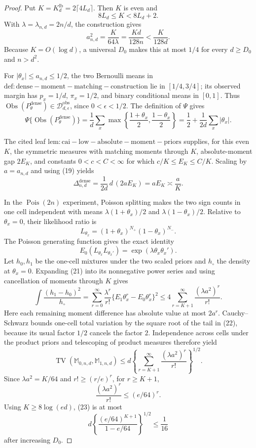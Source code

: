 \documentclass{article}
\begin{document}
\begin{proof}
Put \(K=K_d^{\mathrm{lb}}=2\lceil4L_d\rceil\).  Then \(K\) is even and
\[
 8L_d\leq K<8L_d+2.                                                  \tag{18}
\]
With \(\lambda=\lambda_{n,d}=2n/d\), the construction gives
\[
 a_{n,d}^2=\frac K{64\lambda}=\frac{Kd}{128n}<\frac K{128d}.
\]
Because \(K=O(\log d)\), a universal \(D_0\) makes this at most \(1/4\) for every \(d\geq D_0\) and \(n>d^2\).

For \(|\theta_x|\leq a_{n,d}\leq1/2\), the two Bernoulli means in \(\mathrm{def:dense-moment-matching-construction}\) lie in \([1/4,3/4]\); its observed margin has \(p_x=1/d\), \(\pi_x=1/2\), and binary conditional means in \([0,1]\).  Thus \(\operatorname{Obs}(P_\theta^{\mathrm{dense}})\in\mathcal D_{d,\epsilon}^{\mathrm{obs}}\), since \(0<\epsilon<1/2\).  The definition of \(\Psi\) gives
\[
 \Psi\{\operatorname{Obs}(P_\theta^{\mathrm{dense}})\}
 =\frac1d\sum_x\max\left\{\frac{1+\theta_x}{2},\frac{1-\theta_x}{2}\right\}
 =\frac12+\frac1{2d}\sum_x|\theta_x|.                              \tag{19}
\]

The cited leaf \(\mathrm{lem:cai-low-absolute-moment-priors}\) supplies, for this even \(K\), the symmetric measures with matching moments through \(K\), absolute-moment gap \(2E_K\), and constants \(0<c<C<\infty\) for which \(c/K\leq E_K\leq C/K\).  Scaling by \(a=a_{n,d}\) and using (19) yields
\[
 \Delta_{n,d}^{\mathrm{dense}}=\frac1{2d}\,d\,(2aE_K)=aE_K
 \asymp\frac aK.                                                     \tag{20}
\]

In the \(\operatorname{Pois}(2n)\) experiment, Poisson splitting makes the two sign counts in one cell independent with means \(\lambda(1+\theta_x)/2\) and \(\lambda(1-\theta_x)/2\).  Relative to \(\theta_x=0\), their likelihood ratio is
\[
 L_{\theta_x}=(1+\theta_x)^{N_+}(1-\theta_x)^{N_-}.
\]
The Poisson generating function gives the exact identity
\[
 E_0(L_{\theta_x}L_{\theta_x'})
 =\exp(\lambda\theta_x\theta_x').                                  \tag{21}
\]
Let \(h_0,h_1\) be the one-cell mixtures under the two scaled priors and \(h_\circ\) the density at \(\theta_x=0\).  Expanding (21) into its nonnegative power series and using cancellation of moments through \(K\) gives
\[
 \int\frac{(h_1-h_0)^2}{h_\circ}
 =\sum_{r=0}^{\infty}\frac{\lambda^r}{r!}
   \{E_1\theta_x^r-E_0\theta_x^r\}^2
 \leq4\sum_{r=K+1}^{\infty}\frac{(\lambda a^2)^r}{r!}.           \tag{22}
\]
Here each remaining moment difference has absolute value at most \(2a^r\).  Cauchy--Schwarz bounds one-cell total variation by the square root of the tail in (22), because its usual factor \(1/2\) cancels the factor \(2\).  Independence across cells under the product priors and telescoping of product measures therefore yield
\[
 \operatorname{TV}(\mathbb M_{0,n,d},\mathbb M_{1,n,d})
 \leq d\left\{\sum_{r=K+1}^{\infty}\frac{(\lambda a^2)^r}{r!}\right\}^{1/2}. \tag{23}
\]
Since \(\lambda a^2=K/64\) and \(r!\geq(r/e)^r\), for \(r\geq K+1\),
\[
 \frac{(\lambda a^2)^r}{r!}\leq(e/64)^r.
\]
Using \(K\geq8\log(ed)\), (23) is at most
\[
 d\left\{\frac{(e/64)^{K+1}}{1-e/64}\right\}^{1/2}\leq\frac1{16} \tag{24}
\]
after increasing \(D_0\).


\end{proof}
\end{document}
